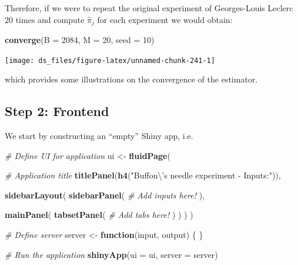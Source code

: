\documentclass[12pt,]{krantz}
\newenvironment{Shaded}{\begin{snugshade}}{\end{snugshade}}
\newcommand{\KeywordTok}[1]{\textcolor[rgb]{0.27,0.27,0.27}{\textbf{#1}}}
\newcommand{\DataTypeTok}[1]{\textcolor[rgb]{0.27,0.27,0.27}{#1}}
\newcommand{\DecValTok}[1]{\textcolor[rgb]{0.06,0.06,0.06}{#1}}
\newcommand{\CharTok}[1]{\textcolor[rgb]{0.5,0.5,0.5}{#1}}
\newcommand{\StringTok}[1]{\textcolor[rgb]{0.5,0.5,0.5}{#1}}
\newcommand{\CommentTok}[1]{\textcolor[rgb]{0.37,0.37,0.37}{\textit{#1}}}
\newcommand{\ControlFlowTok}[1]{\textcolor[rgb]{0.27,0.27,0.27}{\textbf{#1}}}
\newcommand{\NormalTok}[1]{#1}
\begin{document}
Therefore, if we were to repeat the original experiment of Georges-Louis
Leclerc 20 times and compute \(\hat{\pi}_j\) for each experiment we
would obtain:

\begin{Shaded}
\begin{Highlighting}[]
\KeywordTok{converge}\NormalTok{(}\DataTypeTok{B =} \DecValTok{2084}\NormalTok{, }\DataTypeTok{M =} \DecValTok{20}\NormalTok{, }\DataTypeTok{seed =} \DecValTok{10}\NormalTok{)}
\end{Highlighting}
\end{Shaded}

\begin{center}\texttt{[image: ds\_files/figure-latex/unnamed-chunk-241-1]} \end{center}

which provides some illustrations on the convergence of the estimator.

\subsection{Step 2: Frontend}\label{step-2-frontend}

We start by constructing an ``empty'' Shiny app, i.e.

\begin{Shaded}
\begin{Highlighting}[]
\CommentTok{# Define UI for application}
\NormalTok{ui <-}\StringTok{ }\KeywordTok{fluidPage}\NormalTok{(}
  
  \CommentTok{# Application title}
  \KeywordTok{titlePanel}\NormalTok{(}\KeywordTok{h4}\NormalTok{(}\StringTok{"Buffon}\CharTok{\textbackslash{}'}\StringTok{s needle experiment - Inputs:"}\NormalTok{)),}
  
  \KeywordTok{sidebarLayout}\NormalTok{(}
    \KeywordTok{sidebarPanel}\NormalTok{(}
      \CommentTok{# Add inputs here!}
\NormalTok{    ),}
    
    \KeywordTok{mainPanel}\NormalTok{(}
      \KeywordTok{tabsetPanel}\NormalTok{(}
        \CommentTok{# Add tabs here!}
\NormalTok{      )}
\NormalTok{    )}
\NormalTok{  )}
\NormalTok{)}

\CommentTok{# Define server}
\NormalTok{server <-}\StringTok{ }\ControlFlowTok{function}\NormalTok{(input, output) \{}
\NormalTok{\}}

\CommentTok{# Run the application }
\KeywordTok{shinyApp}\NormalTok{(}\DataTypeTok{ui =}\NormalTok{ ui, }\DataTypeTok{server =}\NormalTok{ server)}
\end{Highlighting}
\end{Shaded}
\end{document}
